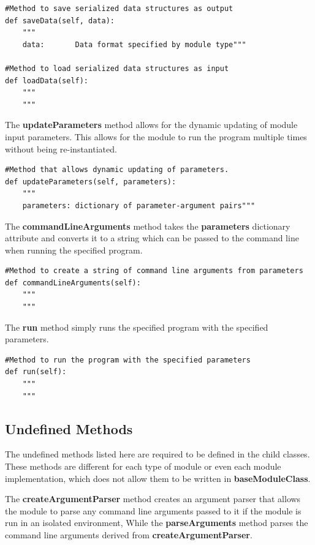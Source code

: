 \begin{lstlisting}[frame=single]        
#Method to save serialized data structures as output
def saveData(self, data):
	"""
	data:		Data format specified by module type"""
	
#Method to load serialized data structures as input
def loadData(self):
	"""
	"""
\end{lstlisting}

The \textbf{updateParameters} method allows for the dynamic updating of module input parameters. This allows for the module to run the program multiple times without being re-instantiated.

\begin{lstlisting}[frame=single]    
#Method that allows dynamic updating of parameters.
def updateParameters(self, parameters):
	"""
	parameters:	dictionary of parameter-argument pairs"""
\end{lstlisting}

The \textbf{commandLineArguments} method takes the \textbf{parameters} dictionary attribute and converts it to a string which can be passed to the command line when running the specified program.

\begin{lstlisting}[frame=single]
#Method to create a string of command line arguments from parameters
def commandLineArguments(self):
	"""
	"""
\end{lstlisting}

The \textbf{run} method simply runs the specified program with the specified parameters. 

\begin{lstlisting}[frame=single]    
#Method to run the program with the specified parameters
def run(self):
	"""
	"""
\end{lstlisting}

\subsection{Undefined Methods}

The undefined methods listed here are required to be defined in the child classes. These methods are different for each type of module or even each module implementation, which does not allow them to be written in \textbf{baseModuleClass}. 

The \textbf{createArgumentParser} method creates an argument parser that allows the module to parse any command line arguments passed to it if the module is run in an isolated environment, While the \textbf{parseArguments} method parses the command line arguments derived from \textbf{createArgumentParser}.

